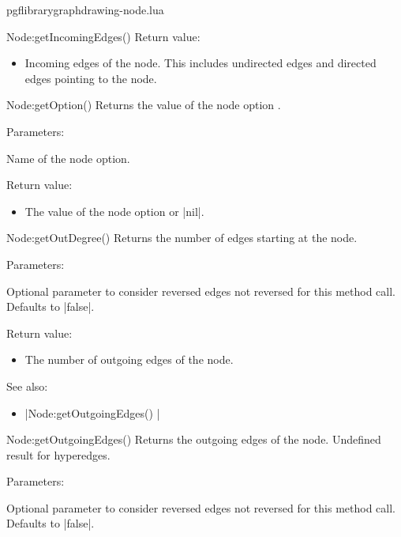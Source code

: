 \begin{filedescription}{pgflibrarygraphdrawing-node.lua}
\begin{luacommand}{{Node:getIncomingEdges}()}
Return value:
\begin{itemize} \item[] Incoming edges of the node. This includes undirected edges and directed edges pointing to the node.  \end{itemize}


\end{luacommand}\begin{luacommand}{{Node:getOption}()}
Returns the value of the node option . 

Parameters:
\begin{parameterdescription}
	\item[\meta{name}] Name of the node option. 
\end{parameterdescription}


Return value:
\begin{itemize} \item[] The value of the node option  or |nil|.  \end{itemize}


\end{luacommand}\begin{luacommand}{{Node:getOutDegree}()}
Returns the number of edges starting at the node. 

Parameters:
\begin{parameterdescription}
	\item[\meta{ignorereversed}] Optional parameter to consider reversed edges not reversed for this method call. Defaults to |false|. 
\end{parameterdescription}


Return value:
\begin{itemize} \item[] The number of outgoing edges of the node.  \end{itemize}


See also:
\begin{itemize}
	\item[] |Node:getOutgoingEdges() |
\end{itemize}

\end{luacommand}\begin{luacommand}{{Node:getOutgoingEdges}()}
Returns the outgoing edges of the node. Undefined result for hyperedges. 

Parameters:
\begin{parameterdescription}
	\item[\meta{ignorereversed}] Optional parameter to consider reversed edges not reversed for this method call. Defaults to |false|. 
\end{parameterdescription}



\end{luacommand}
\end{filedescription}
